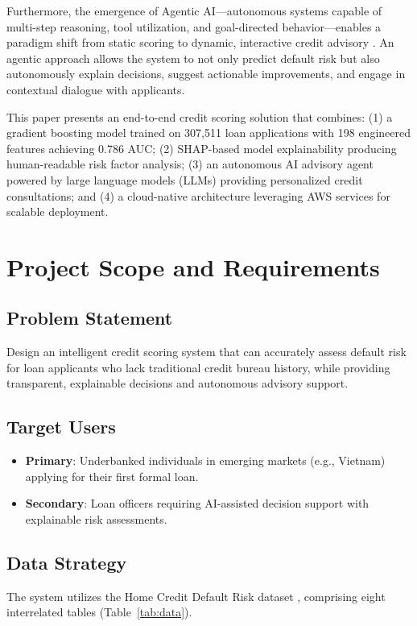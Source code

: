 \documentclass[12pt,a4paper]{article}
\begin{document}
Furthermore, the emergence of Agentic AI---autonomous systems capable of multi-step reasoning, tool utilization, and goal-directed behavior---enables a paradigm shift from static scoring to dynamic, interactive credit advisory \cite{wang2024agents}. An agentic approach allows the system to not only predict default risk but also autonomously explain decisions, suggest actionable improvements, and engage in contextual dialogue with applicants.

This paper presents an end-to-end credit scoring solution that combines: (1) a gradient boosting model trained on 307,511 loan applications with 198 engineered features achieving 0.786 AUC; (2) SHAP-based model explainability producing human-readable risk factor analysis; (3) an autonomous AI advisory agent powered by large language models (LLMs) providing personalized credit consultations; and (4) a cloud-native architecture leveraging AWS services for scalable deployment.

\section{Project Scope and Requirements}

\subsection{Problem Statement}
Design an intelligent credit scoring system that can accurately assess default risk for loan applicants who lack traditional credit bureau history, while providing transparent, explainable decisions and autonomous advisory support.

\subsection{Target Users}
\begin{itemize}
    \item \textbf{Primary}: Underbanked individuals in emerging markets (e.g., Vietnam) applying for their first formal loan.
    \item \textbf{Secondary}: Loan officers requiring AI-assisted decision support with explainable risk assessments.
\end{itemize}

\subsection{Data Strategy}
The system utilizes the Home Credit Default Risk dataset \cite{homecredit2018}, comprising eight interrelated tables (Table~\ref{tab:data}).
\end{document}
